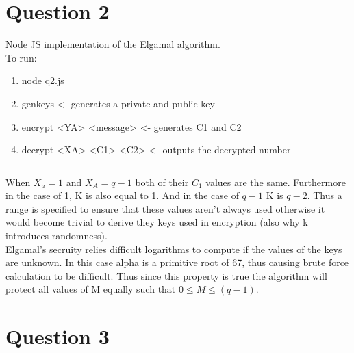 \documentclass[fleqn, 12pt]{article}
\newcommand{\codefile}{\inputminted}
\begin{document}
\section*{Question 2}

Node JS implementation of the Elgamal algorithm.\\

To run:

\begin{enumerate}
    \item node q2.js
    \item genkeys <- generates a private and public key
    \item encrypt <YA> <message> <- generates C1 and C2
    \item decrypt <XA> <C1> <C2> <- outputs the decrypted number
\end{enumerate}

\codefile{javascript}{q2.js}

When $X_a = 1$ and $X_A=q-1$ both of their $C_1$ values are the same. Furthermore in the case of 1, K is also equal to 1. And in the case of $q-1$ K is $q-2$. Thus a range is specified to ensure that these values aren't always used otherwise it would become trivial to derive they keys used in encryption (also why k introduces randomness).\\

Elgamal's secruity relies difficult logarithms to compute if the values of the keys are unknown. In this case alpha is a primitive root of 67, thus causing brute force calculation to be difficult. Thus since this property is true the algorithm will protect all values of M equally such that $0 \leq M \leq (q-1)$.

\section*{Question 3}
\end{document}

